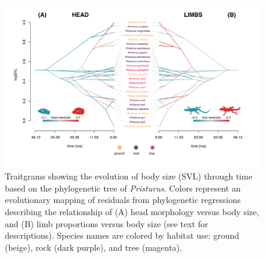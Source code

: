 \documentclass[
  11pt,
]{article}
\begin{document}
\begin{figure}

{\centering \includegraphics[width=1\linewidth]{Figs/figure_3_Pristurus_allometry_traitgram_legends} 

}

\caption{Traitgrams showing the evolution of body size (SVL) through time based on the phylogenetic tree of \textit{Pristurus}. Colors represent an evolutionary mapping of residuals from phylogenetic regressions describing the relationship of (A) head morphology versus body size, and (B) limb proportions versus body size (see text for descriptions). Species names are colored by habitat use: ground (beige), rock (dark purple), and tree (magenta).}\label{fig:unnamed-chunk-6}
\end{figure}

\newpage
\end{document}
